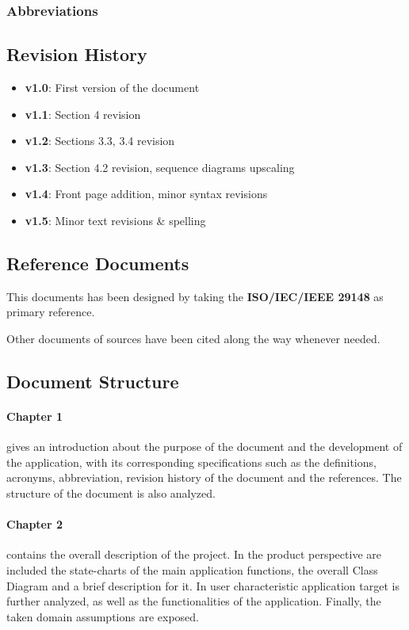 \subsubsection{Abbreviations}


\subsection{Revision History}
\begin{itemize}
	\item \textbf{v1.0}: First version of the document
	\item \textbf{v1.1}: Section 4 revision
	\item \textbf{v1.2}: Sections 3.3, 3.4 revision
	\item \textbf{v1.3}: Section 4.2 revision, sequence diagrams upscaling
	\item \textbf{v1.4}: Front page addition, minor syntax revisions
	\item \textbf{v1.5}: Minor text revisions \& spelling
	
\end{itemize}


\subsection{Reference Documents}
This documents has been designed by taking the \textbf{ISO/IEC/IEEE 29148} as primary reference.\cite{STANDARD}\newline


\noindent Other documents of sources have been cited along the way whenever needed.

\subsection{Document Structure}
\paragraph{Chapter 1}
gives an introduction about the purpose of the document and the development of the application, with its corresponding specifications such as the definitions, acronyms, abbreviation,
revision history of the document and the references.\newline
The structure of the document is also analyzed.

\paragraph{Chapter 2}
contains the overall description of the project. In the product perspective are included the state-charts of the main application functions, the overall Class Diagram and a brief description for it. \newline 
In user characteristic application target is further analyzed, as well as the functionalities of the application. \newline
Finally, the taken domain assumptions are exposed.


